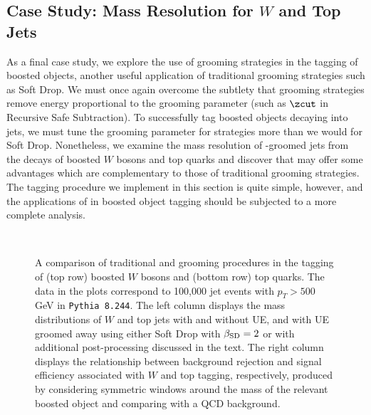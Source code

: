 \documentclass[letterpaper,11pt]{article}
\begin{document}
\subsection{Case Study: Mass Resolution for \(W\) and Top Jets}
\label{sec:massres}

    As a final case study, we explore the use of \PIRANHA{} grooming strategies in the tagging of boosted objects, another useful application of traditional grooming strategies such as Soft Drop.
   We must once again overcome the subtlety that \PIRANHA{} grooming strategies remove energy proportional to the grooming parameter (such as \(\zcut\) in Recursive Safe Subtraction).
   To successfully tag boosted objects decaying into jets, we must tune the grooming parameter for \PIRANHA{} strategies more than we would for Soft Drop.
   Nonetheless, we examine the mass resolution of \PIRANHA{}-groomed jets from the decays of boosted \(W\) bosons and top quarks and discover that \PIRANHA{} may offer some advantages which are complementary to those of traditional grooming strategies.
   The tagging procedure we implement in this section is quite simple, however, and the applications of \PIRANHA{} in boosted object tagging should be subjected to a more complete analysis.

\begin{figure}[p]
\centering
{}
\\
\caption{
     A comparison of traditional and \PIRANHA{} grooming procedures in the tagging of (top row) boosted \(W\) bosons and (bottom row) top quarks.
      The data in the plots correspond to 100,000 jet events with \(p_T > 500\) GeV in \texttt{Pythia 8.244}.
      The left column displays the mass distributions of \(W\) and top jets with and without UE, and with UE groomed away using either Soft Drop with \(\beta_{\rm SD} = 2\) or  with additional post-processing discussed in the text.
      The right column displays the relationship between background rejection and signal efficiency associated with \(W\) and top tagging, respectively, produced by considering symmetric windows around the mass of the relevant boosted object and comparing with a QCD background.
      }
\label{fig:tagging}
\end{figure}
\end{document}
